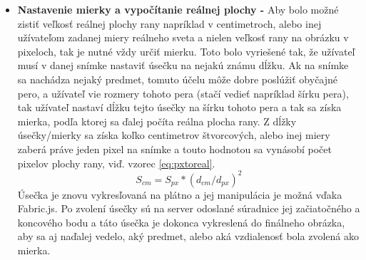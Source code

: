 \begin{itemize}
\item \textbf{Nastavenie mierky a vypočítanie reálnej plochy -} Aby bolo možné zistiť veľkosť reálnej plochy rany napríklad v centimetroch, alebo inej užívateľom zadanej miery reálneho sveta a nielen veľkosť rany na obrázku v pixeloch, tak je nutné vždy určiť mierku. Toto bolo vyriešené tak, že užívateľ musí v danej snímke nastaviť úsečku na nejakú známu dĺžku. Ak na snímke sa nachádza nejaký predmet, tomuto účelu môže dobre poslúžiť obyčajné pero, a užívateľ vie rozmery tohoto pera (stačí vedieť napríklad šírku pera), tak užívateľ nastaví dĺžku tejto úsečky na šírku tohoto pera a tak sa získa mierka, podľa ktorej sa ďalej počíta reálna plocha rany. Z dĺžky úsečky/mierky sa získa koľko centimetrov štvorcových, alebo inej miery zaberá práve jeden pixel na snímke a touto hodnotou sa vynásobí počet pixelov plochy rany, viď. vzorec \ref{eq:pxtoreal}. 
\begin{equation}
    \label{eq:pxtoreal}
    S_{cm} = S_{px} * {(d_{cm}/d_{px})}^2
\end{equation}
Úsečka je znovu vykresľovaná na plátno a jej manipulácia je možná vďaka Fabric.js. Po zvolení úsečky sú na server odoslané súradnice jej začiatočného a koncového bodu a táto úsečka je dokonca vykreslená do finálneho obrázka, aby sa aj naďalej vedelo, aký predmet, alebo aká vzdialenosť bola zvolená ako mierka.
\end{itemize}